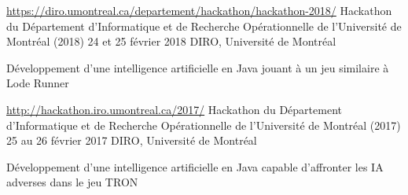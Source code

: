 \begin{cventries}
{    }
    \cventry
  {\url{https://diro.umontreal.ca/departement/hackathon/hackathon-2018/}}
  {Hackathon du Département d'Informatique et de Recherche Opérationnelle de l'Université de Montréal (2018)}
    {24 et 25 février 2018}
    {DIRO, Université de Montréal}
    {
      \begin{cvitems}
      \item{Développement d'une intelligence artificielle en Java jouant à un jeu similaire à Lode Runner}
      \end{cvitems}
    }
    \cventry
  {\url{http://hackathon.iro.umontreal.ca/2017/}}
  {Hackathon du Département d'Informatique et de Recherche Opérationnelle de l'Université de Montréal (2017)}
    {25 au 26 février 2017}
    {DIRO, Université de Montréal}
    {
      \begin{cvitems}
      \item{Développement d'une intelligence artificielle en Java capable d'affronter les IA adverses dans le jeu TRON}
      \end{cvitems}
    }
\end{cventries}
